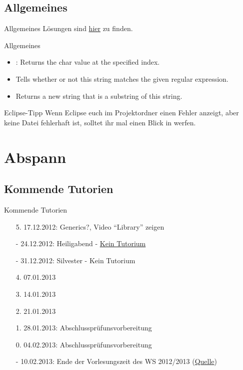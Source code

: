 \documentclass[usepdftitle=false,hyperref={pdfpagelabels=false}]{beamer}
\begin{document}
\subsection{Allgemeines}
\begin{frame}{Allgemeines}
    Lösungen sind \href{https://github.com/MartinThoma/prog-ws1213/tree/master/Blatt-03}{hier} zu finden.
\end{frame}
\begin{frame}{Allgemeines}
    \begin{itemize}[<+->]
        \item {}:
              Returns the char value at the specified index.
        \item {}
              Tells whether or not this string matches the given regular expression.
        \item {} Returns a new string that is a substring of this string.
    \end{itemize}
    \pause[\thebeamerpauses]
    \begin{block}{Eclipse-Tipp}
        Wenn Eclipse euch im Projektordner einen Fehler anzeigt, aber
        keine Datei fehlerhaft ist, solltet ihr mal einen
        Blick in  werfen.
    \end{block}
\end{frame}

\section{Abspann}
\subsection{Kommende Tutorien}
\begin{frame}{Kommende Tutorien}
  \begin{itemize}
    \item[5.] 17.12.2012: Generics?, Video "`Library"' zeigen
    \item[-] 24.12.2012: Heiligabend - \href{http://www.fmc.uni-karlsruhe.de/faq/wann-sind-die-weihnachtsferien}{Kein Tutorium}
    \item[-] 31.12.2012: Silvester - Kein Tutorium
    \item[4.] 07.01.2013
    \item[3.] 14.01.2013
    \item[2.] 21.01.2013
    \item[1.] 28.01.2013: Abschlussprüfunsvorbereitung
    \item[0.] 04.02.2013: Abschlussprüfunsvorbereitung
    \item[-] 10.02.2013: Ende der Vorlesungszeit des WS 2012/2013 (\href{http://www.kit.edu/studieren/2873.php}{Quelle})
  \end{itemize}
\end{frame}

\end{document}

